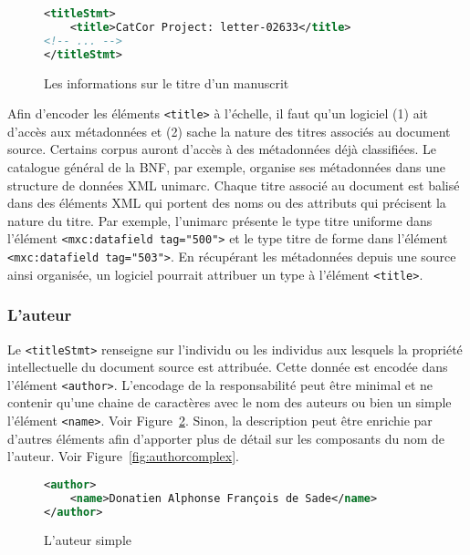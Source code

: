\documentclass[class=article, crop=false]{standalone}
\begin{document}
\begin{figure}[ht]
\centering
\begin{lstlisting}[language=XML]
<titleStmt>
	<title>CatCor Project: letter-02633</title>
<!-- ... -->
</titleStmt>
\end{lstlisting}
\caption{Les informations sur le titre d'un manuscrit \protect\footnotemark}
\label{fig:manuTitle}
\end{figure}

Afin d'encoder les éléments \texttt{<title>} à l'échelle, il faut qu'un logiciel (1) ait d'accès aux métadonnées et (2) sache la nature des titres associés au document source. Certains corpus auront d'accès à des métadonnées déjà classifiées. Le catalogue général de la \acrshort{BNF}, par exemple, organise ses métadonnées dans une structure de données \acrshort{XML} \Gls{unimarc}. Chaque titre associé au document est balisé dans des éléments \acrshort{XML} qui portent des noms ou des attributs qui précisent la nature du titre. Par exemple, l'\Gls{unimarc} présente le type \og{}titre uniforme\fg{} dans l'élément \texttt{<mxc:datafield tag="500">} et le type \og{}titre de forme\fg{} dans l'élément \texttt{<mxc:datafield tag="503">}. En récupérant les métadonnées depuis une source ainsi organisée, un logiciel pourrait attribuer un type à l'élément \texttt{<title>}. 

\subsubsection{L'auteur}
Le \texttt{<titleStmt>} renseigne sur l'individu ou les individus aux lesquels la propriété intellectuelle du document source est attribuée. Cette donnée est encodée dans l'élément \texttt{<author>}. L'encodage de la responsabilité peut être minimal et ne contenir qu'une chaine de caractères avec le nom des auteurs ou bien un simple l'élément \texttt{<name>}. Voir Figure~\ref{fig:authorsimple}. Sinon, la description peut être enrichie par d'autres éléments afin d'apporter plus de détail sur les composants du nom de l'auteur. Voir Figure~\ref{fig:authorcomplex}.

\begin{figure}[ht]
\centering
\begin{lstlisting}[language=XML]
<author>
	<name>Donatien Alphonse François de Sade</name>
</author>
\end{lstlisting}
\caption{L'auteur simple}
\label{fig:authorsimple}
\end{figure}
\end{document}
